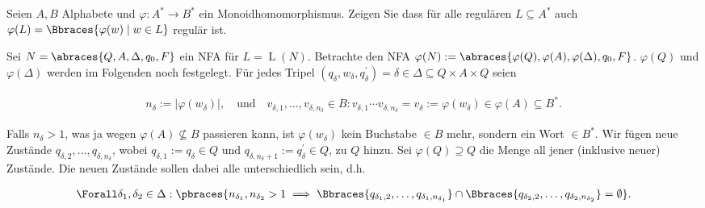 
\begin{exercise}

Seien $A, B$ Alphabete und $\varphi: A^\ast \to B^\ast$ ein Monoidhomomorphismus.
Zeigen Sie dass für alle regulären $L \subseteq A^\ast$ auch $\varphi(L) = \Bbraces{\varphi(w) \mid w \in L}$ regulär ist.

\end{exercise}


\begin{solution}

Sei $N = \abraces{Q, A, \Delta, q_0, F}$ ein NFA für $L = \operatorname L(N)$.
Betrachte den NFA $\varphi(N) := \abraces{\varphi(Q), \varphi(A), \varphi(\Delta), q_0, F}$.
$\varphi(Q)$ und $\varphi(\Delta)$ werden im Folgenden noch festgelegt.
Für jedes Tripel $(q_\delta, w_\delta, q_\delta^\prime) = \delta \in \Delta \subseteq Q \times A \times Q$ seien

\begin{align*}
    n_\delta := |\varphi(w_\delta)|,
    \quad
    \text{und}
    \quad
    v_{\delta, 1}, \dots, v_{\delta, n_\delta} \in B:
        v_{\delta, 1} \cdots v_{\delta, n_\delta}
        =
        v_\delta
        :=
        \varphi(w_\delta)
        \in
        \varphi(A) \subseteq B^\ast.
\end{align*}

Falls $n_\delta > 1$, was ja wegen $\varphi(A) \not \subseteq B$ passieren kann, ist $\varphi(w_\delta)$ kein Buchstabe $\in B$ mehr, sondern ein  Wort $\in B^\ast$.
Wir fügen neue Zustände $q_{\delta, 2}, \dots, q_{\delta, n_{\delta}}$, wobei $q_{\delta, 1} := q_\delta \in Q$ und $q_{\delta, n_\delta + 1} := q_\delta^\prime \in Q$, zu $Q$ hinzu.
Sei $\varphi(Q) \supseteq Q$ die Menge all jener (inklusive neuer) Zustände.
Die neuen Zustände sollen dabei alle unterschiedlich sein, d.h.

\begin{align*}
    \Forall \delta_1, \delta_2 \in \Delta:
        \pbraces
        {
            n_{\delta_1}, n_{\delta_2} > 1
            \implies
            \Bbraces{q_{\delta_1, 2}, \dots, q_{\delta_1, n_{\delta_1}}}
            \cap
            \Bbraces{q_{\delta_2, 2}, \dots, q_{\delta_2, n_{\delta_2}}}
            =
            \emptyset
        }.
\end{align*}


\end{solution}
